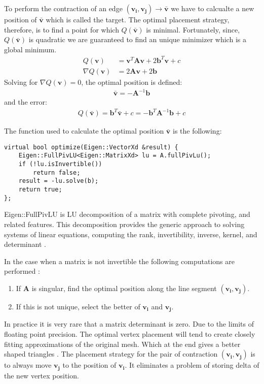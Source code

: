 To perform the contraction of an edge $(\mathbf{v_i}, \mathbf{v_j})\rightarrow\bar{\mathbf{v}}$ we have to calcualte a new position of $\mathbf{\bar{v}}$ which is called the target. The optimal placement strategy, therefore, is to find a point for which $Q(\mathbf{\bar{v}})$ is minimal. Fortunately, since, $Q(\mathbf{\bar{v}})$ is quadratic we are guaranteed to find an unique minimizer which is a global minimum.
\begin{align}
Q(\mathbf{v}) &= \mathbf{v}^T\mathbf{A}\mathbf{v} + 2\mathbf{b}^T\mathbf{v} + c\\
\nabla Q(\mathbf{v}) &= 2\mathbf{A}\mathbf{v} + 2 \mathbf{b}
\end{align}
Solving for $\nabla Q(\mathbf{v}) = 0$, the optimal position is defined:
\begin{align}
\mathbf{\bar{v}} = -\mathbf{A}^{-1}\mathbf{b}
\end{align}
and the error:
\begin{align}
Q(\mathbf{\bar{v}}) = \mathbf{b}^T\mathbf{\bar{v}} + c = -\mathbf{b}^T\mathbf{A}^{-1}\mathbf{b} + c
\end{align}

The function used to calculate the optimal position $\mathbf{\bar{v}}$ is the following:
\begin{center}
\begin{lstlisting}[caption={LU decomposition for solving a linear system.},captionpos=b]
virtual bool optimize(Eigen::VectorXd &result) {
	Eigen::FullPivLU<Eigen::MatrixXd> lu = A.fullPivLu();
	if (!lu.isInvertible())
		return false;
	result = -lu.solve(b);
	return true;
};
\end{lstlisting}
\end{center}
Eigen::FullPivLU is LU decomposition of a matrix with complete pivoting, and related features. This decomposition provides the generic approach to solving systems of linear equations, computing the rank, invertibility, inverse, kernel, and determinant \cite{eigenLU19}.

In the case when a matrix is not invertible the following computations are performed \cite{garland99}:
\begin{enumerate}
\item If $\mathbf{A}$ is singular, find the optimal position along the line segment $(\mathbf{v_i}, \mathbf{v_j})$.
\item If this is not unique, select the better of $\mathbf{v_i}$ and $ \mathbf{v_j}$.
\end{enumerate}
In practice it is very rare that a matrix determinant is zero. Due to the limits of floating point precision. The optimal vertex placement will tend to create closely fitting approximations of the original mesh. Which at the end gives a better shaped triangles \cite{garland99}. The placement strategy for the pair of contraction $(\mathbf{v_i}, \mathbf{v_j})$ is to always move $\mathbf{v_j}$ to the position of $\mathbf{v_i}$. It eliminates a problem of storing delta of the new vertex position.

